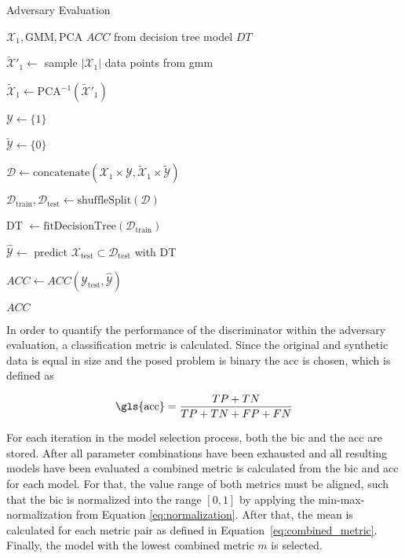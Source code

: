 \documentclass[../../main.tex]{subfiles}
\begin{document}
\begin{algorithm}
    \caption{Adversary Evaluation}
    \label{alg:adversary_evaluation}
 
    \begin{algorithmic}[1]
        \REQUIRE $\mathcal{X}_1, \text{GMM}, \text{PCA}$
        \ENSURE $ACC$ from decision tree model $DT$

        \STATE $\tilde{\mathcal{X}}'_1 \leftarrow$ sample $|\mathcal{X}_1|$ data points from \gls{gmm}

        \STATE $\tilde{\mathcal{X}}_1 \leftarrow \text{PCA}^{-1}(\tilde{\mathcal{X}}'_1)$ 

        \STATE $\mathcal{Y} \leftarrow \{ 1 \}$
        
        \STATE $\tilde{\mathcal{Y}} \leftarrow \{ 0 \}$

        \STATE $\mathcal{D} \leftarrow \text{concatenate}(\mathcal{X}_1 \times \mathcal{Y}, \tilde{\mathcal{X}}_1 \times \tilde{\mathcal{Y}})$
        
        \STATE $\mathcal{D}_{\text{train}}, \mathcal{D}_{\text{test}} \leftarrow \text{shuffleSplit}(\mathcal{D})$

        \STATE DT $\leftarrow \text{fitDecisionTree}(\mathcal{D}_{\text{train}})$

        \STATE $\hat{\mathcal{Y}} \leftarrow$ predict $\mathcal{X}_{\text{test}} \subset \mathcal{D}_{\text{test}}$ with DT

        \STATE $ACC \leftarrow ACC(\mathcal{Y}_{\text{test}}, \hat{\mathcal{Y}})$

        \RETURN $ACC$
    \end{algorithmic}
 \end{algorithm}

In order to quantify the performance of the discriminator within the adversary evaluation, a classification metric is calculated. Since the original and synthetic data is equal in size and the posed problem is binary the \gls{acc} is chosen, which is defined as

 \begin{equation}
    \text{\gls{acc}} = \frac{TP + TN}{TP + TN + FP + FN}
 \end{equation}

 For each iteration in the model selection process, both the \gls{bic} and the \gls{acc} are stored. After all parameter combinations have been exhausted and all resulting models have been evaluated a combined metric is calculated from the \gls{bic} and \gls{acc} for each model. For that, the value range of both metrics must be aligned, such that the \gls{bic} is normalized into the range $[0, 1]$ by applying the min-max-normalization from Equation \ref{eq:normalization}. After that, the mean is calculated for each metric pair as defined in Equation~\ref{eq:combined_metric}. Finally, the model with the lowest combined metric $m$ is selected. 
 
\end{document}
